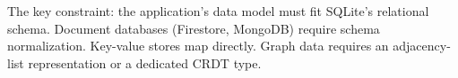 The key constraint: the application's data model must fit SQLite's relational
schema. Document databases (Firestore, MongoDB) require schema normalization.
Key-value stores map directly. Graph data requires an adjacency-list
representation or a dedicated CRDT type.

